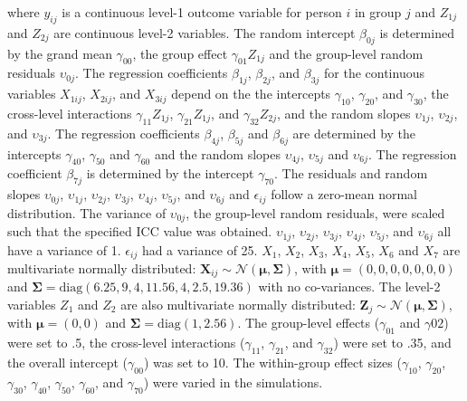 \documentclass[10pt, a4paper, titlepage]{article}
\begin{document}
\begin{subequations}
\end{subequations} where $y_{ij}$ is a continuous level-1 outcome variable for person $i$ in group $j$ and $Z_{1j}$ and $Z_{2j}$ are continuous level-2 variables. The random intercept $\beta_{0j}$ is determined by the grand mean $\gamma_{00}$, the group effect $\gamma_{01}Z_{1j}$ and the group-level random residuals $\upsilon_{0j}$. The regression coefficients $\beta_{1j}$, $\beta_{2j}$, and $\beta_{3j}$ for the continuous variables $X_{1ij}$, $X_{2ij}$, and $X_{3ij}$ depend on the the intercepts $\gamma_{10}$, $\gamma_{20}$, and $\gamma_{30}$, the cross-level interactions $\gamma_{11}Z_{1j}$, $\gamma_{21}Z_{1j}$, and $\gamma_{32}Z_{2j}$, and the random slopes $\upsilon_{1j}$, $\upsilon_{2j}$, and $\upsilon_{3j}$. The regression coefficients $\beta_{4j}$, $\beta_{5j}$ and $\beta_{6j}$ are determined by the intercepts $\gamma_{40}$, $\gamma_{50}$ and $\gamma_{60}$ and the random slopes $\upsilon_{4j}$, $\upsilon_{5j}$ and $\upsilon_{6j}$. The regression coefficient $\beta_{7j}$ is determined by the intercept $\gamma_{70}$. The residuals and random slopes $\upsilon_{0j}$, $\upsilon_{1j}$, $\upsilon_{2j}$, $\upsilon_{3j}$, $\upsilon_{4j}$, $\upsilon_{5j}$, and $\upsilon_{6j}$ and $\epsilon_{ij}$ follow a zero-mean normal distribution. The variance of $\upsilon_{0j}$, the group-level random residuals, were scaled such that the specified ICC value was obtained. $\upsilon_{1j}$, $\upsilon_{2j}$, $\upsilon_{3j}$, $\upsilon_{4j}$, $\upsilon_{5j}$, and $\upsilon_{6j}$ all have a variance of 1. $\epsilon_{ij}$ had a variance of 25. $X_1$, $X_2$, $X_3$, $X_4$, $X_5$, $X_6$ and $X_7$ are multivariate normally distributed: $\mathbf{X}_{ij} \sim \mathcal{N}(\boldsymbol{\mu}, \boldsymbol{\Sigma})$, with $\boldsymbol{\mu} = (0, 0, 0, 0, 0, 0, 0)$ and $\boldsymbol{\Sigma} = \text{diag}(6.25, 9, 4, 11.56, 4, 2.5, 19.36)$ with no co-variances. The level-2 variables $Z_1$ and $Z_2$ are also multivariate normally distributed:  $\mathbf{Z}_{j} \sim \mathcal{N}(\boldsymbol{\mu}, \boldsymbol{\Sigma})$, with $\boldsymbol{\mu} = (0, 0)$ and $\boldsymbol{\Sigma} = \text{diag}(1, 2.56)$. The group-level effects ($\gamma_{01}$ and $\gamma{02}$) were set to .5, the cross-level interactions ($\gamma_{11}$, $\gamma_{21}$, and $\gamma_{32}$) were set to .35, and the overall intercept ($\gamma_{00}$) was set to 10. The within-group effect sizes ($\gamma_{10}$, $\gamma_{20}$, $\gamma_{30}$, $\gamma_{40}$, $\gamma_{50}$, $\gamma_{60}$, and $\gamma_{70}$) were varied in the simulations.
\end{document}

